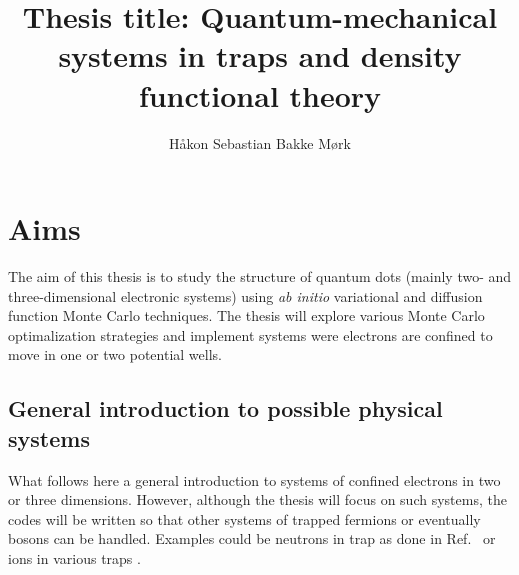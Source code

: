 \documentclass[twocolumn]{revtex4}
\begin{document}
\title{Thesis title: Quantum-mechanical systems in traps and density functional theory}
\author{H\aa kon Sebastian Bakke M\o rk}
\maketitle
\section*{Aims}
The aim of this thesis is to study the structure of quantum dots
(mainly two- and three-dimensional electronic systems) using {\em ab initio} 
variational and diffusion function Monte Carlo
techniques. The thesis will explore various Monte Carlo optimalization
strategies and implement systems were electrons are confined to move
in one or two potential wells.

\subsection*{General introduction to possible physical systems}

What follows here a general introduction to systems of confined electrons in two or three dimensions.
However, although the thesis will focus on such systems, the codes will be written so that other systems of trapped 
fermions or eventually bosons can be handled. Examples could be neutrons in trap as done in Ref.~\cite{bogner2011} or ions in various traps \cite{yoram2008}.  
\end{document}
